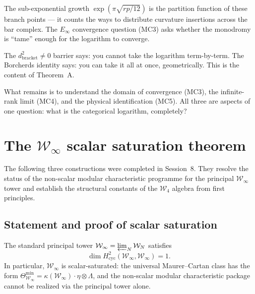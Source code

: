 \documentclass[11pt]{article}
\newcommand{\cW}{\mathcal{W}}
\begin{document}
The sub-exponential growth $\exp(\pi\sqrt{rp/12})$ is the
partition function of these branch points --- it counts the ways
to distribute curvature insertions across the bar complex.  The
$E_\infty$ convergence question (MC3) asks whether the monodromy
is ``tame'' enough for the logarithm to converge.

The $d_{\mathrm{bracket}}^2 \neq 0$ barrier says: you cannot
take the logarithm term-by-term.  The Borcherds identity says:
you can take it all at once, geometrically.  This is the content
of Theorem~A.

What remains is to understand the domain of convergence (MC3),
the infinite-rank limit (MC4), and the physical identification
(MC5).  All three are aspects of one question: what is the
categorical logarithm, completely?



\section{The $\cW_\infty$ scalar saturation theorem}

The following three constructions were completed in Session~8.
They resolve the status of the non-scalar modular characteristic
programme for the principal $\cW_\infty$ tower and establish the
structural constants of the $\cW_4$ algebra from first principles.

\subsection{Statement and proof of scalar saturation}

\begin{theorem}[Scalar saturation of $\cW_\infty$]\label{thm:winfty-scalar}
The standard principal tower
$\cW_\infty = \varprojlim_N \cW_N$ satisfies
\[
\dim H^2_{\mathrm{cyc}}(\cW_\infty, \cW_\infty) = 1.
\]
In particular, $\cW_\infty$ is scalar-saturated:
the universal Maurer--Cartan class has the form
$\Theta_{\cW_\infty}^{\min} = \kappa(\cW_\infty) \cdot \eta \otimes \Lambda$,
and the non-scalar modular characteristic package cannot be realized
via the principal tower alone.
\end{theorem}
\end{document}
